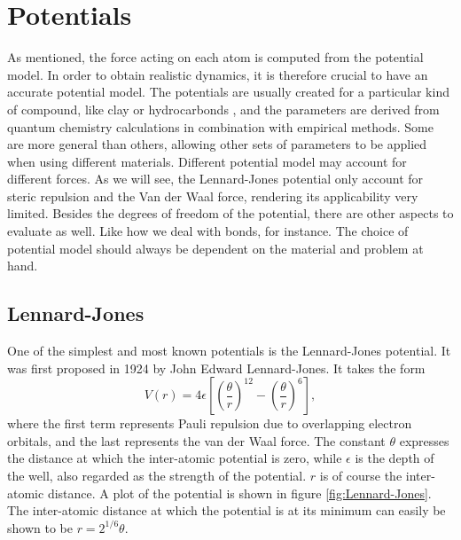 \documentclass[twoside,english]{uiofysmaster}
\newcommand\lr[1]{\left(#1\right)}
\begin{document}
\section{Potentials}
As mentioned, the force acting on each atom is computed from the potential model.
In order to obtain realistic dynamics, it is therefore crucial to have an accurate potential model. 
The potentials are usually created for a particular kind of compound, like clay or hydrocarbonds \cite{Cygan2004,VanDuin2001}, and the parameters are derived from quantum chemistry calculations in combination with empirical methods.
Some are more general than others, allowing other sets of parameters to be applied when using different materials. 
Different potential model may account for different forces. 
As we will see, the Lennard-Jones potential only account for steric repulsion and the Van der Waal force, rendering its applicability very limited.
Besides the degrees of freedom of the potential, there are other aspects to evaluate as well. 
Like how we deal with bonds, for instance.
The choice of potential model should always be dependent on the material and problem at hand.  
 

\subsection{Lennard-Jones} \label{sec:LJ}
One of the simplest and most known potentials is the Lennard-Jones potential. It was first proposed in 1924 by John Edward Lennard-Jones.  It takes the form
\begin{equation}
	V(r) = 4\epsilon\left[\lr{\frac{\theta}{r}}^{12} -  \lr{\frac{\theta}{r}}^6 \right], \label{eq:Lennard-Jones}
\end{equation}
where the first term represents Pauli repulsion due to overlapping electron orbitals, and the last represents the van der Waal force. 
The constant $\theta$ expresses the distance at which the inter-atomic potential is zero, while $\epsilon$ is the depth of the well, also regarded as the strength of the potential.
$r$ is of course the inter-atomic distance. 
A plot of the potential is shown in figure \ref{fig:Lennard-Jones}.
The inter-atomic distance at which the potential is at its minimum can easily be shown to be $r=2^{1/6}\theta$. 
\end{document}
